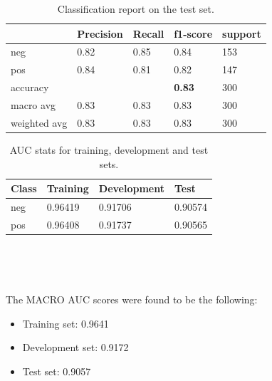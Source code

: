 \documentclass[10pt, a4paper]{article}
\begin{document}
  \begin{table}
		\begin{tabular}{|l|l|l|l|l|}
			\hline
			\cellcolor{blue!25}\textbf{} & \cellcolor{blue!25}\textbf{Precision} &
			\cellcolor{blue!25}\textbf{Recall}  &
			\cellcolor{blue!25}\textbf{f1-score}  &
			\cellcolor{blue!25}\textbf{support}\\
			\hline
			neg & 0.82 & 0.85 & 0.84 & 153 \\\hline
			pos & 0.84  & 0.81 & 0.82 & 147 \\\hline
			accuracy & & & \textbf{0.83} & 300 \\\hline
            macro avg & 0.83 & 0.83 & 0.83 & 300 \\\hline
            weighted avg & 0.83 & 0.83 & 0.83 & 300 \\\hline
            
		\end{tabular}
		\centering
		\caption{Classification report on the test set.}
		\label{tab::ex-1-report-test}
	\end{table}

 	\begin{table}
		\begin{tabular}{|l|l|l|l|}
			\hline
			\cellcolor{blue!25}\textbf{Class} & \cellcolor{blue!25}\textbf{Training} & \cellcolor{blue!25}\textbf{Development} & \cellcolor{blue!25}\textbf{Test}\\
			\hline
			neg & 0.96419 & 0.91706 & 0.90574 \\\hline
			pos & 0.96408 & 0.91737 & 0.90565 \\\hline
			
		\end{tabular}
		\centering
		\caption{AUC stats for training, development and test sets.}
		\label{tab::ex-1-stats-auc}
	\end{table}
 \ 



 \

 The MACRO AUC scores were found to be the following:
 \begin{itemize}
     \item Training set: 0.9641
     \item Development set: 0.9172
     \item Test set: 0.9057
 \end{itemize}
    
	\printbibliography
	
\end{document}
